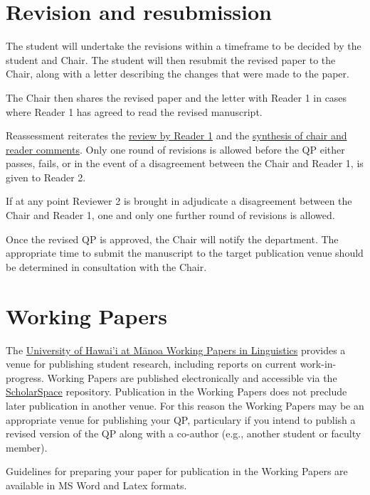 \documentclass[
]{book}
\begin{document}
\hypertarget{revisions}{%
\section{Revision and resubmission}\label{revisions}}

The student will undertake the revisions within a timeframe to be decided by the student and Chair. The student will then resubmit the revised paper to the Chair, along with a letter describing the changes that were made to the paper.

The Chair then shares the revised paper and the letter with Reader 1 in cases where Reader 1 has agreed to read the revised manuscript.

Reassessment reiterates the \protect\hyperlink{reader1}{review by Reader 1} and the \protect\hyperlink{synthesis}{synthesis of chair and reader comments}. Only one round of revisions is allowed before the QP either passes, fails, or in the event of a disagreement between the Chair and Reader 1, is given to Reader 2.

If at any point Reviewer 2 is brought in adjudicate a disagreement between the Chair and Reader 1, one and only one further round of revisions is allowed.

Once the revised QP is approved, the Chair will notify the department. The appropriate time to submit the manuscript to the target publication venue should be determined in consultation with the Chair.

\hypertarget{wp}{%
\section{Working Papers}\label{wp}}

The \href{http://ling.hawaii.edu/research-current/publications/workingpapers/}{University of Hawai'i at Mānoa Working Papers in Linguistics} provides a venue for publishing student research, including reports on current work-in-progress. Working Papers are published electronically and accessible via the \href{https://hdl.handle.net/10125/42386}{ScholarSpace} repository. Publication in the Working Papers does not preclude later publication in another venue. For this reason the Working Papers may be an appropriate venue for publishing your QP, particulary if you intend to publish a revised version of the QP along with a co-author (e.g., another student or faculty member).

Guidelines for preparing your paper for publication in the Working Papers are available in MS Word and Latex formats.
\end{document}
